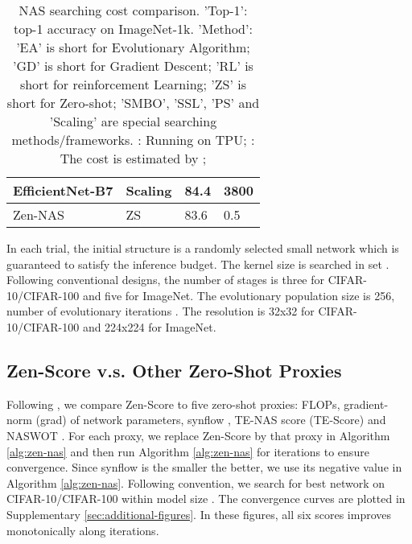 \documentclass{article}
\providecommand{\citep}{\cite}
\begin{document}
\begin{table}[!]
\begin{center}
\begin{tabular}{@{}llll@{}}
     EfficientNet-B7 \citep{tanEfficientNetRethinkingModel2019} & Scaling    & 84.4       & 3800    \\ \midrule
     Zen-NAS    & ZS    & 83.6       & 0.5    \\ \bottomrule
     \end{tabular}
 \end{center}  
 \caption{NAS searching cost comparison. 
 'Top-1': top-1 accuracy on ImageNet-1k. 
 'Method': 'EA' is short for Evolutionary Algorithm; 'GD' is short for Gradient Descent; 'RL' is short for reinforcement Learning; 'ZS' is short for Zero-shot; 'SMBO', 'SSL', 'PS' and 'Scaling' are special searching methods/frameworks. 
  : Running on TPU; : The cost is estimated by \citep{wanFBNetV2DifferentiableNeural2020};}
 \label{tab:nas-cost}
\end{table}





In each trial, the initial structure is a randomly selected small network which is guaranteed to satisfy the inference budget. The kernel size is searched in set . Following conventional designs, the number of stages is three for CIFAR-10/CIFAR-100 and five for ImageNet.  The evolutionary population size is 256, number of evolutionary iterations . The resolution  is 32x32 for CIFAR-10/CIFAR-100 and 224x224 for ImageNet.

\subsection{Zen-Score v.s. Other Zero-Shot Proxies}
\label{sec:Zen-Score-vs-SOTA-Zero-Shot-Proxies}

Following \cite{abdelfattahZeroCostProxiesLightweight2021,chen2021neural},  we compare Zen-Score to  five zero-shot proxies: FLOPs, gradient-norm (grad) of network parameters, synflow \cite{tanakaPruningNeuralNetworks2020}, TE-NAS score (TE-Score) \cite{chen2021neural} and NASWOT \cite{mellorNeuralArchitectureSearch2021a}. For each proxy, we replace Zen-Score by that proxy in Algorithm \ref{alg:zen-nas} and then run Algorithm \ref{alg:zen-nas} for  iterations to ensure convergence. Since synflow is the smaller the better, we use its negative value in Algorithm \ref{alg:zen-nas}.  Following convention, we search for best network on CIFAR-10/CIFAR-100 within model size . The convergence curves are plotted in Supplementary \ref{sec:additional-figures}. In these figures, all six scores improves monotonically along  iterations. 
\end{document}
